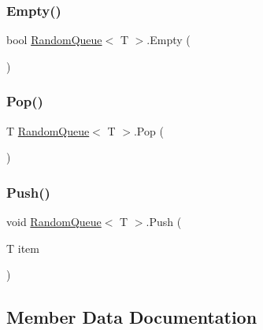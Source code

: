 \mbox{\label{class_random_queue_af19660c14e19e166a4632a37cba1a8c1}} 
\subsubsection{\texorpdfstring{Empty()}{Empty()}}
{\footnotesize\ttfamily bool \mbox{\hyperlink{class_random_queue}{Random\+Queue}}$<$ T $>$.Empty (\begin{DoxyParamCaption}{ }\end{DoxyParamCaption})}

\mbox{\label{class_random_queue_a15fed32fe3e55df6f1fe883e019525f1}} 
\subsubsection{\texorpdfstring{Pop()}{Pop()}}
{\footnotesize\ttfamily T \mbox{\hyperlink{class_random_queue}{Random\+Queue}}$<$ T $>$.Pop (\begin{DoxyParamCaption}{ }\end{DoxyParamCaption})}

\mbox{\label{class_random_queue_a9b04768a955285d6df22824f12874958}} 
\subsubsection{\texorpdfstring{Push()}{Push()}}
{\footnotesize\ttfamily void \mbox{\hyperlink{class_random_queue}{Random\+Queue}}$<$ T $>$.Push (\begin{DoxyParamCaption}\item[{T}]{item }\end{DoxyParamCaption})}



\subsection{Member Data Documentation}
\mbox{\label{class_random_queue_a33495067868e22aa274248df60013b11}} 
